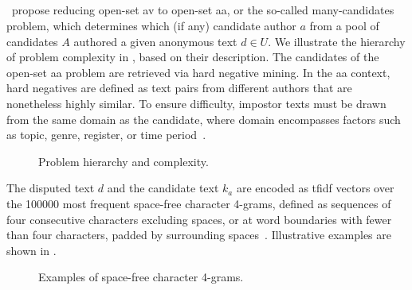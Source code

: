 \subsection{\impApprTitle{}}
\label{sec:impostor_method_theory}

\citet{koppel_determining_2014}\ propose reducing open-set \ac{av} to open-set \ac{aa}, or the so-called many-candidates problem, which determines which (if any) candidate author $a$ from a pool of candidates $A$ authored a given anonymous text $d \in U$. 
We illustrate the hierarchy of problem complexity in , based on their description.
The candidates of the open-set \ac{aa} problem are retrieved via hard negative mining. 
In the \ac{aa} context, hard negatives are defined as text pairs from different authors that are nonetheless highly similar. 
To ensure difficulty, impostor texts must be drawn from the same domain as the candidate, where domain encompasses factors such as topic, genre, register, or time period~\citep{bischoff_importance_2020}. 

\begin{figure}[htbp]
    \centering
    
    \caption{Problem hierarchy and complexity.}
    \label{fig:problem_hierarchy}
\end{figure}

The disputed text $d$ and the candidate text $k_a$ are encoded as \ac{tfidf} vectors over the \num{100000} most frequent space-free character 4-grams, defined as sequences of four consecutive characters excluding spaces, or at word boundaries with fewer than four characters, padded by surrounding spaces~\citep{koppel_authorship_2011,neal_surveying_2018}. 
Illustrative examples are shown in .

\begin{figure}[ht]
    \centering
    \caption{Examples of space-free character 4-grams.}
    \label{fig:spacefree_4gram}
\end{figure}


